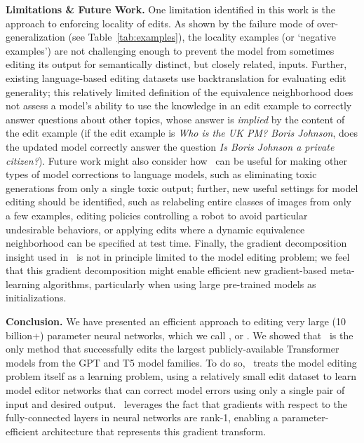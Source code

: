 \documentclass{article}
\begin{document}
\textbf{Limitations \& Future Work.} One limitation identified in this work is the approach to enforcing locality of edits. As shown by the failure mode of over-generalization (see Table~\ref{tab:examples}), the locality examples (or `negative examples') are not challenging enough to prevent the model from sometimes editing its output for semantically distinct, but closely related, inputs. Further, existing language-based editing datasets use backtranslation for evaluating edit generality; this relatively limited definition of the equivalence neighborhood does not assess a model's ability to use the knowledge in an edit example to correctly answer questions about other topics, whose answer is \textit{implied} by the content of the edit example (if the edit example is \textit{Who is the UK PM? Boris Johnson}, does the updated model correctly answer the question \textit{Is Boris Johnson a private citizen?}). Future work might also consider how \name~can be useful for making other types of model corrections to language models, such as eliminating toxic generations from only a single toxic output; further, new useful settings for model editing should be identified, such as relabeling entire classes of images from only a few examples, editing policies controlling a robot to avoid particular undesirable behaviors, or applying edits where a dynamic equivalence neighborhood can be specified at test time. Finally, the gradient decomposition insight used in \name~is not in principle limited to the model editing problem; we feel that this gradient decomposition might enable efficient new gradient-based meta-learning algorithms, particularly when using large pre-trained models as initializations.

\textbf{Conclusion.} We have presented an efficient approach to editing very large (10 billion+) parameter neural networks, which we call \fullname, or \name. We showed that \name~is the only method that successfully edits the largest publicly-available Transformer models from the GPT and T5 model families. To do so, \name~treats the model editing problem itself as a learning problem, using a relatively small edit dataset to learn model editor networks that can correct model errors using only a single pair of input and desired output. \name~leverages the fact that gradients with respect to the fully-connected layers in neural networks are rank-1, enabling a parameter-efficient architecture that represents this gradient transform.


\newpage



\newpage

\appendix


\end{document}
